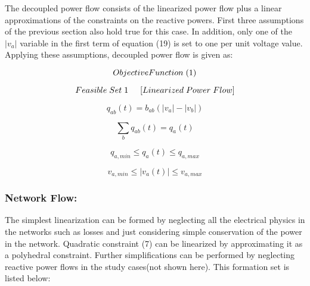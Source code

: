The decoupled power flow consists of the linearized power flow plus a linear approximations of the constraints on the reactive powers. First three assumptions of the previous section also hold true for this case. In addition, only one of the $|v_a|$ variable in the first term of equation (19) is set to one per unit voltage value. Applying these assumptions, decoupled power flow is given as: 

\begin{tcolorbox}[colback=gray!5!white,colframe=gray!25!black,title=Feasible Set 2 (Decoupled Power Flow):]
\[
Objective Function\hspace{0.1cm}(1)
\]

\[
Feasible \hspace{0.1cm} Set \hspace{0.1cm} 1 \hspace{0.5cm} [Linearized \hspace{0.1cm} Power \hspace{0.1cm}  Flow] 
\]

\[
  q_{ab}(t)=b_{ab}(|v_a| - |v_b|)
\]

\[
\sum_b q_{ab}(t)=q_a(t)
\]

\[
q_{a,min}\leq q_{a}(t)\leq q_{a,max}
\]

\[
v_{a,min}\leq \left |v_{a}(t) \right | \leq v_{a,max}
\]
\end{tcolorbox}

\subsubsection{Network Flow:}

The simplest linearization can be formed by neglecting all the electrical physics in the networks such as losses and just considering simple conservation of the power in the network. Quadratic constraint (7) can be linearized by approximating it as a polyhedral constraint. Further simplifications can be performed by neglecting reactive power flows in the study cases(not shown here). This formation set is listed below: 

